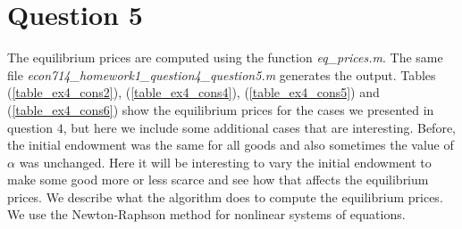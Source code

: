 \documentclass[a4paper,12pt]{article}
\begin{document}
    
    
    
    \medskip
    \medskip
    \section*{Question 5}   
    \medskip
    
    The equilibrium prices are computed using the function \textit{eq\_prices.m}. The same file \textit{econ714\_homework1\_question4\_question5.m} generates the output. Tables (\ref{table_ex4_cons2}), (\ref{table_ex4_cons4}), (\ref{table_ex4_cons5}) and (\ref{table_ex4_cons6}) show the equilibrium prices for the cases we presented in question $4$, but here we include some additional cases that are interesting. Before, the initial endowment was the same for all goods and also sometimes the value of $\alpha$ was unchanged. Here it will be interesting to vary the initial endowment to make some good more or less scarce and see how that affects the equilibrium prices. We describe what the algorithm does to compute the equilibrium prices. We use the Newton-Raphson method for nonlinear systems of equations. 
    
\end{document}

